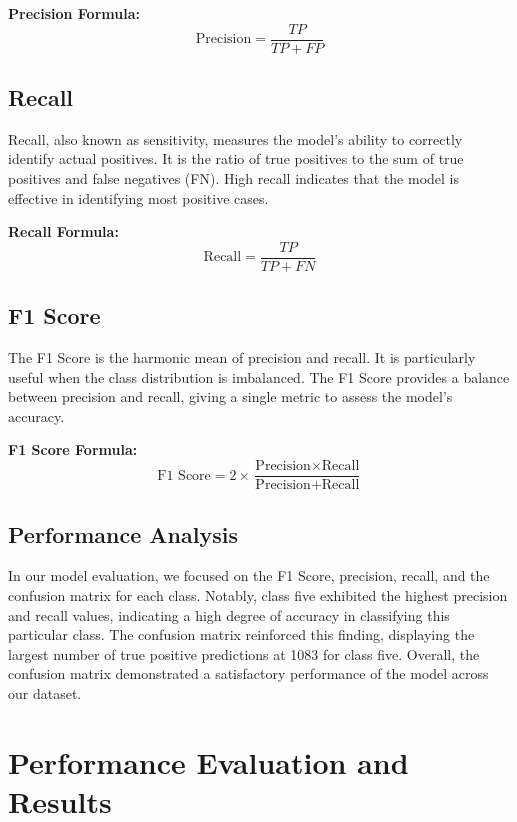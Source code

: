 \documentclass[conference]{IEEEtran}
\begin{document}
\textbf{Precision Formula:}
\begin{equation}
    \text{Precision} = \frac{TP}{TP + FP}
\end{equation}

\subsection{Recall}
Recall, also known as sensitivity, measures the model’s ability to correctly identify actual positives. It is the ratio of true positives to the sum of true positives and false negatives (FN). High recall indicates that the model is effective in identifying most positive cases.

\textbf{Recall Formula:}
\begin{equation}
    \text{Recall} = \frac{TP}{TP + FN}
\end{equation}

\subsection{F1 Score}
The F1 Score is the harmonic mean of precision and recall. It is particularly useful when the class distribution is imbalanced. The F1 Score provides a balance between precision and recall, giving a single metric to assess the model's accuracy.

\textbf{F1 Score Formula:}
\begin{equation}
    \text{F1 Score} = 2 \times \frac{\text{Precision} \times \text{Recall}}{\text{Precision} + \text{Recall}}
\end{equation}

\subsection{Performance Analysis}
In our model evaluation, we focused on the F1 Score, precision, recall, and the confusion matrix for each class. Notably, class five exhibited the highest precision and recall values, indicating a high degree of accuracy in classifying this particular class. The confusion matrix reinforced this finding, displaying the largest number of true positive predictions at 1083 for class five. Overall, the confusion matrix demonstrated a satisfactory performance of the model across our dataset.

\section{Performance Evaluation and Results}
\end{document}
